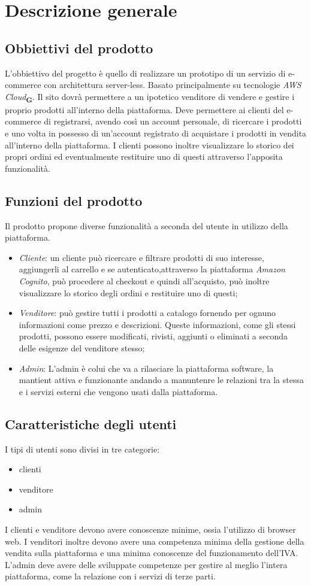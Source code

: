 \section{Descrizione generale}
\subsection{Obbiettivi del prodotto}
L'obbiettivo del progetto è quello di realizzare un prototipo di un servizio di e-commerce con architettura server-less. Basato principalmente su tecnologie \textit{AWS Cloud}\textsubscript{\textbf{G}}. Il sito dovrà permettere a un ipotetico venditore di vendere e gestire i proprio prodotti all'interno della piattaforma. Deve permettere ai clienti del e-commerce di registrarsi, avendo così un account personale, di ricercare i prodotti e uno volta in possesso di un'account registrato di acquistare i prodotti in vendita all'interno della piattaforma. I clienti possono inoltre visualizzare lo storico dei propri ordini ed eventualmente restituire uno di questi attraverso l'apposita funzionalità.
\subsection{Funzioni del prodotto}
Il prodotto propone diverse funzionalità a seconda del utente in utilizzo della piattaforma.
\begin{itemize}
    \item \textit{Cliente}: un cliente può ricercare e filtrare prodotti di suo interesse, aggiungerli al carrello e se autenticato,attraverso la piattaforma \textit{Amazon Cognito}, può procedere al checkout e quindi all'acquisto, può inoltre visualizzare lo storico degli ordini e restituire uno di questi;
    \item \textit{Venditore}: può gestire tutti i prodotti a catalogo fornendo per ognuno informazioni come prezzo e descrizioni. Queste informazioni, come gli stessi prodotti, possono essere modificati, rivisti, aggiunti o eliminati a seconda delle esigenze del venditore stesso;
    \item \textit{Admin}: L'admin è colui che va a rilasciare la piattaforma software, la mantient attiva e funzionante andando a manuntenre le relazioni tra la stessa e i servizi esterni che vengono usati dalla piattaforma.
\end{itemize}
\subsection{Caratteristiche degli utenti}
I tipi di utenti sono divisi in tre categorie:
\begin{itemize}
    \item clienti
    \item venditore
    \item admin
\end{itemize}
I clienti e venditore devono avere conoscenze minime, ossia l'utilizzo di browser  web. I venditori inoltre devono avere una competenza minima della gestione della vendita sulla piattaforma e una minima conoscenze del funzionamento dell'IVA. L'admin deve avere delle sviluppate competenze per gestire al meglio l'intera piattaforma, come la relazione con i servizi di terze parti.
